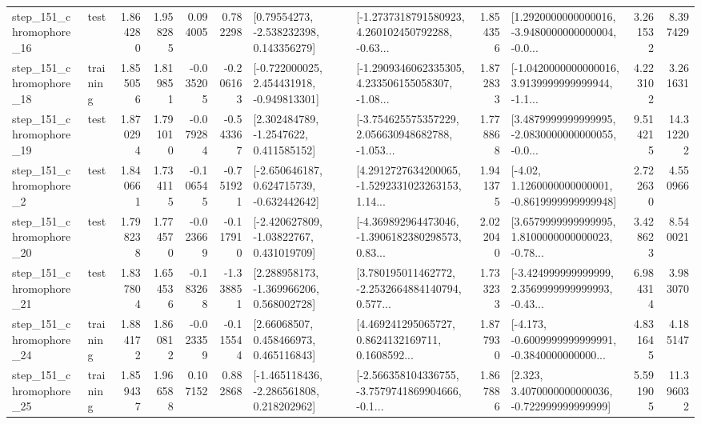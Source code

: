 \begin{tabular}{llrrrrllrlrr}
  step\_151\_chromophore\_16 &      test &      1.864280 &    1.958285 &      0.094005 &  0.782298 &     [0.79554273, -2.538232398, 0.143356279] &  [-1.2737318791580923, 4.260102450792288, -0.63... &       1.854356 &  [1.2920000000000016, -3.9480000000000004, -0.0... &            3.261532 &          8.397429 \\
  step\_151\_chromophore\_18 &  training &      1.855056 &    1.819851 &     -0.035205 & -0.206163 &   [-0.722000025, 2.454431918, -0.949813301] &  [-1.2909346062335305, 4.233506155058307, -1.08... &       1.872833 &  [-1.0420000000000016, 3.9139999999999944, -1.1... &            4.223102 &          3.261631 \\
  step\_151\_chromophore\_19 &      test &      1.870294 &    1.791010 &     -0.079284 & -0.543367 &      [2.302484789, -1.2547622, 0.411585152] &  [-3.754625575357229, 2.056630948682788, -1.053... &       1.778868 &  [3.4879999999999995, -2.0830000000000055, -0.0... &            9.514215 &         14.312202 \\
   step\_151\_chromophore\_2 &      test &      1.840661 &    1.734115 &     -0.106545 & -0.751921 &   [-2.650646187, 0.624715739, -0.632442642] &  [4.2912727634200065, -1.5292331023263153, 1.14... &       1.941375 &   [-4.02, 1.1260000000000001, -0.8619999999999948] &            2.722630 &          4.550966 \\
  step\_151\_chromophore\_20 &      test &      1.798238 &    1.774570 &     -0.023669 & -0.117910 &    [-2.420627809, -1.03822767, 0.431019709] &  [-4.369892964473046, -1.3906182380298573, 0.83... &       2.022040 &  [3.6579999999999995, 1.8100000000000023, -0.78... &            3.428623 &          8.540021 \\
  step\_151\_chromophore\_21 &      test &      1.837804 &    1.654536 &     -0.183268 & -1.338851 &    [2.288958173, -1.369966206, 0.568002728] &  [3.780195011462772, -2.2532664884140794, 0.577... &       1.733233 &  [-3.424999999999999, 2.3569999999999993, -0.43... &            6.984314 &          3.983070 \\
  step\_151\_chromophore\_24 &  training &      1.884172 &    1.860812 &     -0.023359 & -0.115544 &      [2.66068507, 0.458466973, 0.465116843] &  [4.469241295065727, 0.8624132169711, 0.1608592... &       1.877930 &  [-4.173, -0.6009999999999991, -0.3840000000000... &            4.831645 &          4.185147 \\
  step\_151\_chromophore\_25 &  training &      1.859437 &    1.966588 &      0.107152 &  0.882868 &   [-1.465118436, -2.286561808, 0.218202962] &  [-2.566358104336755, -3.7579741869904666, -0.1... &       1.867886 &    [2.323, 3.4070000000000036, -0.722999999999999] &            5.591905 &         11.396032 \\

\end{tabular}
